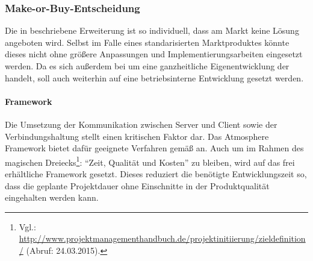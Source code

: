 \subsubsection{Make-or-Buy-Entscheidung} 
\label{subsub:Make-or-Buy-Entscheidung}
Die in  beschriebene Erweiterung ist so individuell, dass am Markt keine Lösung angeboten wird.
Selbst im Falle eines standarisierten Marktproduktes könnte dieses nicht ohne größere Anpassungen und Implementierungsarbeiten
eingesetzt werden. Da es sich außerdem bei  um eine ganzheitliche Eigenentwicklung der  handelt,
soll auch weiterhin auf eine betriebsinterne Entwicklung gesetzt werden.

\paragraph{Framework} Die Umsetzung der Kommunikation zwischen Server und Client sowie der Verbindungshaltung stellt einen
kritischen Faktor dar. Das Atmosphere Framework bietet dafür geeignete Verfahren gemäß  an. Auch um im
Rahmen des magischen Dreiecks\footnote{Vgl.: \url{http://www.projektmanagementhandbuch.de/projektinitiierung/zieldefinition/}
(Abruf: 24.03.2015).}: "`Zeit, Qualität und Kosten"' zu bleiben, wird auf das frei erhältliche Framework gesetzt. Dieses reduziert
die benötigte Entwicklungszeit so, dass die geplante Projektdauer ohne Einschnitte in der Produktqualität eingehalten werden kann.
